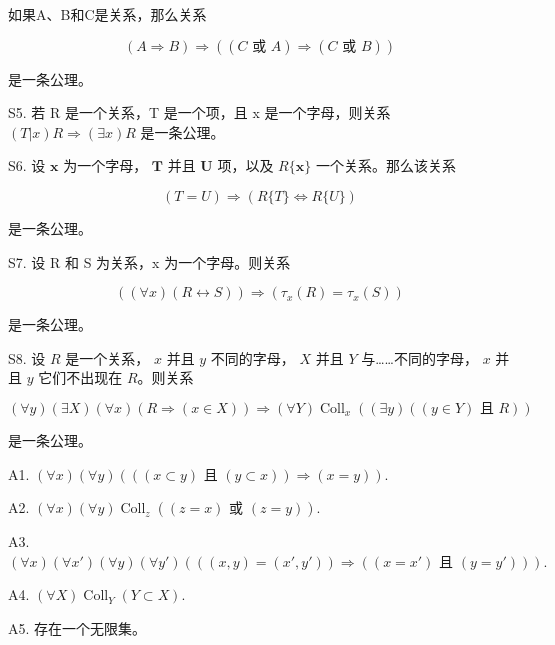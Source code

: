 如果A、B和C是关系，那么关系

\[
(A \Rightarrow B) \Rightarrow ((C \text {   或   } A) \Rightarrow (C \text {   或   } B))
\]

是一条公理。

S5. 若 R 是一个关系，T 是一个项，且 x 是一个字母，则关系 \((T|x)R \Longrightarrow (\exists x)R\) 是一条公理。

S6. 设 \(\pmb{x}\) 为一个字母， \(\pmb{T}\) 并且 \(\pmb{U}\) 项，以及 \(R\{\pmb{x}\}\) 一个关系。那么该关系

\[
(T = U) \Longrightarrow (R \{T \} \Longleftrightarrow R \{U \})
\]

是一条公理。

S7. 设 R 和 S 为关系，x 为一个字母。则关系

\[
((\forall x) (R \leftrightarrow S)) \Longrightarrow (\tau_ {x} (R) = \tau_ {x} (S))
\]

是一条公理。

S8. 设 \(R\) 是一个关系， \(x\) 并且 \(y\) 不同的字母， \(X\) 并且 \(Y\) 与……不同的字母， \(x\) 并且 \(y\) 它们不出现在 \(R\)。则关系

\[
(\forall y)(\exists X)(\forall x)(R \Longrightarrow (x \in X)) \Longrightarrow (\forall Y)\operatorname{Coll}_x((\exists y)((y \in Y) \text{ 且 } R))
\]

是一条公理。

A1. \((\forall x)(\forall y)(((x\subset y)\text{ 且 }(y\subset x))\Longrightarrow (x = y)).\)

A2. \((\forall x)(\forall y)\operatorname{Coll}_z((z = x)\text{ 或 }(z = y)).\)

A3. \((\forall x)(\forall x')(\forall y)(\forall y')(((x, y) = (x', y')) \Longrightarrow ((x = x')\text{ 且 }(y = y'))).\)

A4. \((\forall X)\operatorname{Coll}_{Y}(Y \subset X).\)

A5. 存在一个无限集。
